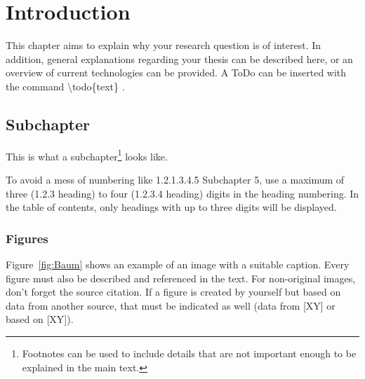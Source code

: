 \documentclass[a4paper, fleqn, headsepline, footsepline, 12pt, parskip=half]{scrartcl}
\begin{document}
\newpage

\tableofcontents
\pagebreak


\pagestyle{headings}

\newpage
\section{Introduction}
\label{sec:introduction}

This chapter aims to explain why your research question is of interest. In addition, general explanations regarding your thesis can be described here, or an overview of current technologies can be provided. A ToDo can be inserted with the command \textbackslash todo\{text\} .


\subsection{Subchapter}
\label{sec:subchapter}

This is what a subchapter\footnote{Footnotes can be used to include details that are not important enough to be explained in the main text.} looks like.

To avoid a mess of numbering like {\glqq}1.2.1.3.4.5 Subchapter 5{\grqq}, use a maximum of three (1.2.3 heading) to four (1.2.3.4 heading) digits in the heading numbering. In the table of contents, only headings with up to three digits will be displayed.


\subsubsection{Figures}
\label{sec:figures}

Figure~\ref{fig:Baum} shows an example of an image with a suitable caption. Every figure must also be described and referenced in the text. For non-original images, don’t forget the source citation. If a figure is created by yourself but based on data from another source, that must be indicated as well (data from [XY] or based on [XY]).
\end{document}
